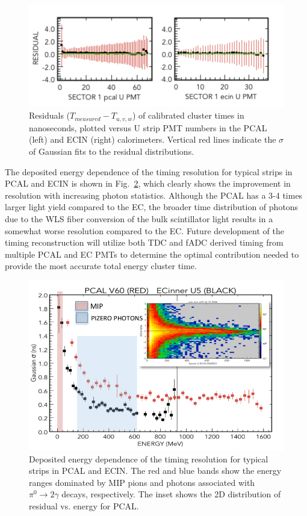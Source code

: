 \begin{figure}[hbt]
\centering
\includegraphics[width=1.0\columnwidth,keepaspectratio]{img/S9_2_1.png}
\caption[]{Residuals ($T_{measured}-T_{u,v,w}$) of calibrated cluster times in nanoseconds, plotted versus U strip PMT numbers in the PCAL (left) and ECIN (right) calorimeters.  Vertical red lines indicate the $\sigma$ of Gaussian fits to the residual distributions.}  
\label{fig:S9_2_1}
\end{figure}

The deposited energy dependence of the timing resolution for typical strips in PCAL and ECIN is shown in Fig.~\ref{fig:S9_2_2}, which clearly shows the improvement in resolution with increasing photon statistics.  Although the PCAL has a 3-4 times larger light yield compared to the EC, the broader time distribution of photons due to the WLS fiber conversion of the bulk scintillator light results in a somewhat worse resolution compared to the EC.  Future development of the timing reconstruction will utilize both TDC and fADC derived timing from multiple PCAL and EC PMTs to determine the optimal contribution needed to provide the most accurate total energy cluster time.

\begin{figure}[hbt]
\centering
\includegraphics[width=1.0\columnwidth,keepaspectratio]{img/S9_2_2.png}
\caption[]{Deposited energy dependence of the timing resolution for typical strips in PCAL and ECIN.  The red and blue bands show the energy ranges dominated by MIP pions and photons associated with $\pi^0\rightarrow 2\gamma$ decays, respectively. The inset shows the 2D distribution of residual vs. energy for PCAL.}
\label{fig:S9_2_2}
\end{figure}


